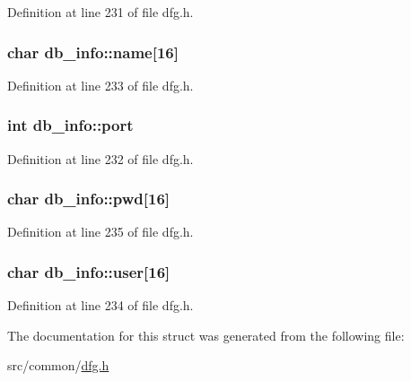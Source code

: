 Definition at line 231 of file dfg.\-h.

\hypertarget{structdb__info_a753b946bdb75a251d7c277feeddf6722}{
\subsubsection[{name}]{\setlength{\rightskip}{0pt plus 5cm}char db\-\_\-info\-::name\mbox{[}16\mbox{]}}}\label{structdb__info_a753b946bdb75a251d7c277feeddf6722}


Definition at line 233 of file dfg.\-h.

\hypertarget{structdb__info_ac425055e92c9cb6184e59126de818c25}{
\subsubsection[{port}]{\setlength{\rightskip}{0pt plus 5cm}int db\-\_\-info\-::port}}\label{structdb__info_ac425055e92c9cb6184e59126de818c25}


Definition at line 232 of file dfg.\-h.

\hypertarget{structdb__info_a498110579dc8f32bed3f6589ddc6d3cb}{
\subsubsection[{pwd}]{\setlength{\rightskip}{0pt plus 5cm}char db\-\_\-info\-::pwd\mbox{[}16\mbox{]}}}\label{structdb__info_a498110579dc8f32bed3f6589ddc6d3cb}


Definition at line 235 of file dfg.\-h.

\hypertarget{structdb__info_a7c2c04a11003ece96e0cdbf3e1e27c60}{
\subsubsection[{user}]{\setlength{\rightskip}{0pt plus 5cm}char db\-\_\-info\-::user\mbox{[}16\mbox{]}}}\label{structdb__info_a7c2c04a11003ece96e0cdbf3e1e27c60}


Definition at line 234 of file dfg.\-h.



The documentation for this struct was generated from the following file\-:\begin{DoxyCompactItemize}
\item 
src/common/\hyperlink{dfg_8h}{dfg.\-h}\end{DoxyCompactItemize}
